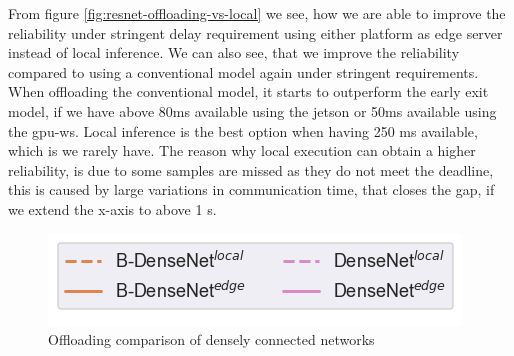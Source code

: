 From figure \ref{fig:resnet-offloading-vs-local} we see, how we are able to improve the reliability under stringent delay requirement using either platform as edge server instead of local inference. We can also see, that we improve the reliability compared to using a conventional model again under stringent requirements. When offloading the conventional model, it starts to outperform the early exit model, if we have above 80ms available using the \gls{jetson} or 50ms available using the \gls{gpu-ws}. Local inference is the best option when having 250 ms available, which is we rarely have. The reason why local execution can obtain a higher reliability, is due to some samples are missed as they do not meet the deadline, this is caused by large variations in communication time, that closes the gap, if we extend the x-axis to above 1 s. 

\begin{figure}
	\captionsetup[subfigure]{justification=centering, farskip=0pt,captionskip=0pt}
	\centering
	\includegraphics[width=.3\linewidth]{figures/edge/gpu_b-densenet_offloading_vs_local_legend}
	\hfill
	\hfill
	\caption[Offloading comparison of densely connected networks]{Offloading comparison of densely connected networks}
	\label{fig:densenet-offloading-vs-local}
\end{figure}

